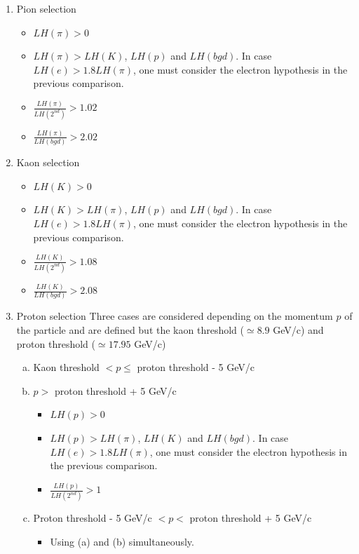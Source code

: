 \documentclass[letterpaper,12pt]{article}
\begin{document}
\begin{enumerate}
  \item Pion selection
  \begin{itemize}
    \item $LH(\pi) > 0$
    \item $LH(\pi) > LH(K)$, $LH(p)$ and $LH(bgd)$. In case $LH(e) > 1.8LH(\pi)$, one must consider the electron hypothesis
    in the previous comparison.
    \item $\frac{LH(\pi)}{LH(2^{nd})}>1.02$
    \item $\frac{LH(\pi)}{LH(bgd)}>2.02$
  \end{itemize}
  \item Kaon selection
  \begin{itemize}
    \item $LH(K) > 0$
    \item $LH(K) > LH(\pi)$, $LH(p)$ and $LH(bgd)$. In case $LH(e) > 1.8LH(\pi)$, one must consider the electron hypothesis
    in the previous comparison.
    \item $\frac{LH(K)}{LH(2^{nd})}>1.08$
    \item $\frac{LH(K)}{LH(bgd)}>2.08$
  \end{itemize}
  \item Proton selection
  Three cases are considered depending on the momentum $p$ of the particle and are defined but the kaon threshold ($\simeq 8.9$ GeV/c)
  and proton threshold ($\simeq 17.95$ GeV/c)
  \begin{enumerate}[(a)]
    \item Kaon threshold $< p \leq$ proton threshold - 5 GeV/c
    \item $p >$ proton threshold + 5 GeV/c
    \begin{itemize}
      \item $LH(p) > 0$
      \item $LH(p) > LH(\pi)$, $LH(K)$ and $LH(bgd)$. In case $LH(e) > 1.8LH(\pi)$, one must consider the electron hypothesis
      in the previous comparison.
      \item $\frac{LH(p)}{LH(2^{nd})}>1$
    \end{itemize}
    \item Proton threshold - 5 GeV/c $< p <$ proton threshold + 5 GeV/c
    \begin{itemize}
      \item Using (a) and (b) simultaneously.
    \end{itemize}
  \end{enumerate}
\end{enumerate}
\end{document}
